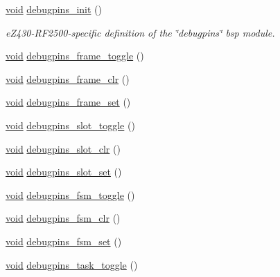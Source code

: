 \begin{DoxyCompactItemize}
\item 
\hyperlink{usb__devapi_8h_afabf60e7f57651d6d595a02c75f07cd0}{void} \hyperlink{group__debugpins_ga67b42e8786576ba76a5dbfd6b61bbf90}{debugpins\+\_\+init} ()
\begin{DoxyCompactList}\small\item\em e\+Z430-\/\+R\+F2500-\/specific definition of the \char`\"{}debugpins\char`\"{} bsp module. \end{DoxyCompactList}\item 
\hyperlink{usb__devapi_8h_afabf60e7f57651d6d595a02c75f07cd0}{void} \hyperlink{group__debugpins_gaf5f2b7fbde11bd076c0c3e867653fa08}{debugpins\+\_\+frame\+\_\+toggle} ()
\item 
\hyperlink{usb__devapi_8h_afabf60e7f57651d6d595a02c75f07cd0}{void} \hyperlink{group__debugpins_gada37390552bee362863d82aa858f7aed}{debugpins\+\_\+frame\+\_\+clr} ()
\item 
\hyperlink{usb__devapi_8h_afabf60e7f57651d6d595a02c75f07cd0}{void} \hyperlink{group__debugpins_ga2a1a3edef66d4588cb179ee254935790}{debugpins\+\_\+frame\+\_\+set} ()
\item 
\hyperlink{usb__devapi_8h_afabf60e7f57651d6d595a02c75f07cd0}{void} \hyperlink{group__debugpins_gaa50950bd15a2a2ad12412ab5fbf0eb12}{debugpins\+\_\+slot\+\_\+toggle} ()
\item 
\hyperlink{usb__devapi_8h_afabf60e7f57651d6d595a02c75f07cd0}{void} \hyperlink{group__debugpins_ga46be7a970bd088dbf58868c806a90ff6}{debugpins\+\_\+slot\+\_\+clr} ()
\item 
\hyperlink{usb__devapi_8h_afabf60e7f57651d6d595a02c75f07cd0}{void} \hyperlink{group__debugpins_ga7707a462a0287f9c35fd70cd7ffbfa6a}{debugpins\+\_\+slot\+\_\+set} ()
\item 
\hyperlink{usb__devapi_8h_afabf60e7f57651d6d595a02c75f07cd0}{void} \hyperlink{group__debugpins_gaa140c9166f959c8bf59b2a5053e7318f}{debugpins\+\_\+fsm\+\_\+toggle} ()
\item 
\hyperlink{usb__devapi_8h_afabf60e7f57651d6d595a02c75f07cd0}{void} \hyperlink{group__debugpins_gaba8ca5762f3946abe08a2fd60f526018}{debugpins\+\_\+fsm\+\_\+clr} ()
\item 
\hyperlink{usb__devapi_8h_afabf60e7f57651d6d595a02c75f07cd0}{void} \hyperlink{group__debugpins_gabf50b5145dad1b666f26d5ddbc824e40}{debugpins\+\_\+fsm\+\_\+set} ()
\item 
\hyperlink{usb__devapi_8h_afabf60e7f57651d6d595a02c75f07cd0}{void} \hyperlink{group__debugpins_ga99a18520e34187483e8914b69ef05afd}{debugpins\+\_\+task\+\_\+toggle} ()

\end{DoxyCompactItemize}
